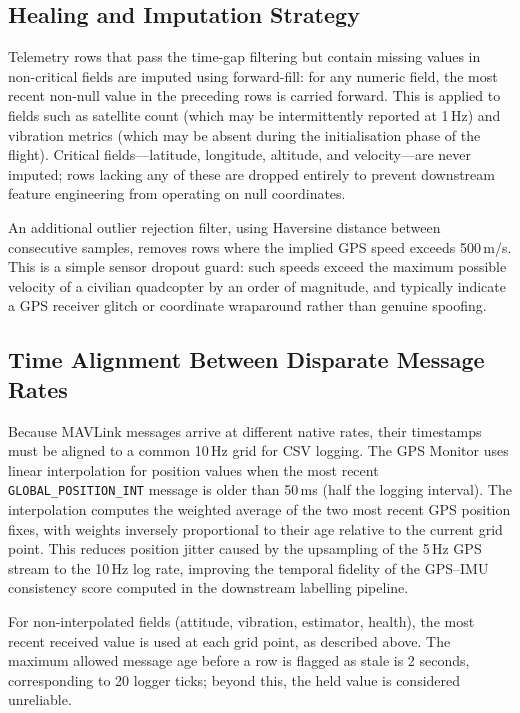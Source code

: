 \subsection{Healing and Imputation Strategy}

Telemetry rows that pass the time-gap filtering but contain missing values in non-critical fields are imputed using forward-fill: for any numeric field, the most recent non-null value in the preceding rows is carried forward. This is applied to fields such as satellite count (which may be intermittently reported at 1\,Hz) and vibration metrics (which may be absent during the initialisation phase of the flight). Critical fields---latitude, longitude, altitude, and velocity---are never imputed; rows lacking any of these are dropped entirely to prevent downstream feature engineering from operating on null coordinates.

An additional outlier rejection filter, using Haversine distance between consecutive samples, removes rows where the implied GPS speed exceeds 500\,m/s. This is a simple sensor dropout guard: such speeds exceed the maximum possible velocity of a civilian quadcopter by an order of magnitude, and typically indicate a GPS receiver glitch or coordinate wraparound rather than genuine spoofing.

\subsection{Time Alignment Between Disparate Message Rates}

Because MAVLink messages arrive at different native rates, their timestamps must be aligned to a common 10\,Hz grid for CSV logging. The GPS Monitor uses linear interpolation for position values when the most recent \texttt{GLOBAL\_POSITION\_INT} message is older than 50\,ms (half the logging interval). The interpolation computes the weighted average of the two most recent GPS position fixes, with weights inversely proportional to their age relative to the current grid point. This reduces position jitter caused by the upsampling of the 5\,Hz GPS stream to the 10\,Hz log rate, improving the temporal fidelity of the GPS--IMU consistency score computed in the downstream labelling pipeline.

For non-interpolated fields (attitude, vibration, estimator, health), the most recent received value is used at each grid point, as described above. The maximum allowed message age before a row is flagged as stale is 2 seconds, corresponding to 20 logger ticks; beyond this, the held value is considered unreliable.

